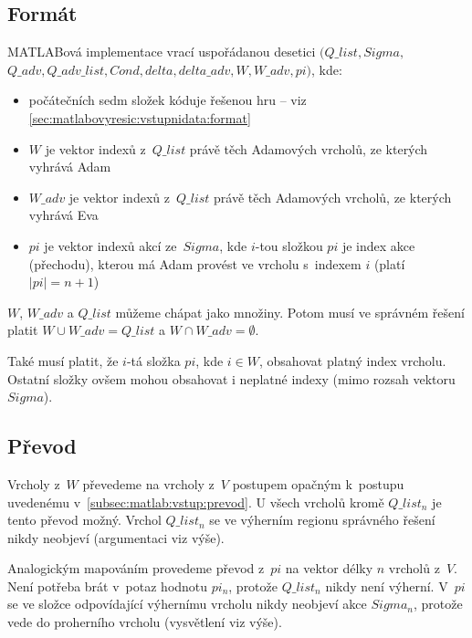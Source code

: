 \subsection{Formát}
MATLABová implementace vrací uspořádanou desetici $(Q\_list, Sigma,$ $Q\_adv, Q\_adv\_list, Cond, delta, delta\_adv, W, W\_adv, pi)$, kde:
\begin{itemize}
\item počátečních sedm složek kóduje řešenou hru -- viz \ref{sec:matlabovyresic:vstupnidata:format}
\item $W$ je vektor indexů z~$Q\_list$ právě těch Adamových vrcholů, ze kterých vyhrává Adam
\item $W\_adv$ je vektor indexů z~$Q\_list$ právě těch Adamových vrcholů, ze kterých vyhrává Eva
\item $pi$ je vektor indexů akcí ze~$Sigma$, kde $i$-tou složkou $pi$ je index akce (přechodu), kterou má Adam provést ve vrcholu s~indexem $i$ (platí $|pi| = n + 1$)
\end{itemize}
$W$, $W\_adv$ a $Q\_list$ můžeme chápat jako množiny. Potom musí ve správném řešení platit $W \cup W\_adv = Q\_list$ a $W \cap W\_adv = \emptyset$.

Také musí platit, že $i$-tá složka $pi$, kde $i \in W$, obsahovat platný index vrcholu. Ostatní složky ovšem mohou obsahovat i neplatné indexy (mimo rozsah vektoru $Sigma$).
\subsection{Převod}
Vrcholy z~$W$ převedeme na vrcholy z~$V$ postupem opačným k~postupu uvedenému v~\ref{subsec:matlab:vstup:prevod}. U všech vrcholů kromě $Q\_list_n$ je tento převod možný. Vrchol $Q\_list_n$ se ve výherním regionu správného řešení nikdy neobjeví (argumentaci viz výše).

Analogickým mapováním provedeme převod z~$pi$ na vektor délky $n$ vrcholů z~$V$. Není potřeba brát v~potaz hodnotu $pi_n$, protože $Q\_list_n$ nikdy není výherní. V~$pi$ se ve složce odpovídající výhernímu vrcholu nikdy neobjeví akce $Sigma_n$, protože vede do proherního vrcholu (vysvětlení viz výše).